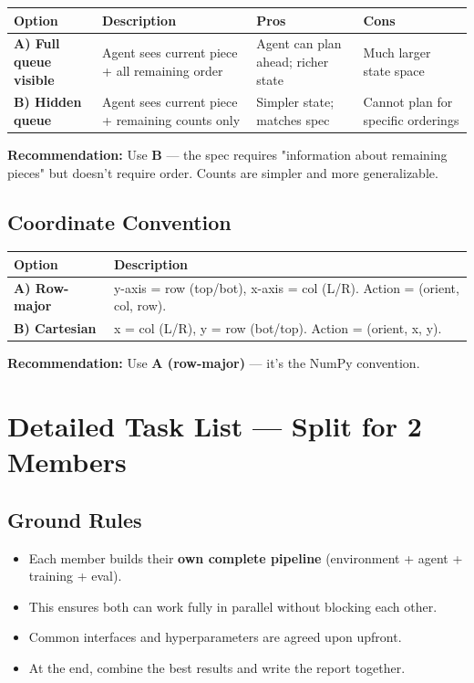 \documentclass[11pt,a4paper]{article}
\begin{document}
\noindent
\begin{tabular}{|l|p{3.5cm}|p{3.5cm}|p{3.5cm}|}
\hline
\textbf{Option} & \textbf{Description} & \textbf{Pros} & \textbf{Cons} \\
\hline
\textbf{A) Full queue visible} & Agent sees current piece + all remaining order & Agent can plan ahead; richer state & Much larger state space \\
\hline
\textbf{B) Hidden queue} & Agent sees current piece + remaining counts only & Simpler state; matches spec & Cannot plan for specific orderings \\
\hline
\end{tabular}

\textbf{Recommendation:} Use \textbf{B} --- the spec requires "information about remaining pieces" but doesn't require order. Counts are simpler and more generalizable.

\subsection{Coordinate Convention}

\noindent
\begin{tabular}{|l|p{11.0cm}|}
\hline
\textbf{Option} & \textbf{Description} \\
\hline
\textbf{A) Row-major} & y-axis = row (top/bot), x-axis = col (L/R). Action = (orient, col, row). \\
\hline
\textbf{B) Cartesian} & x = col (L/R), y = row (bot/top). Action = (orient, x, y). \\
\hline
\end{tabular}

\textbf{Recommendation:} Use \textbf{A (row-major)} --- it's the NumPy convention.

\section{Detailed Task List — Split for 2 Members}

\subsection{Ground Rules}
\begin{itemize}
    \item Each member builds their \textbf{own complete pipeline} (environment + agent + training + eval).
    \item This ensures both can work fully in parallel without blocking each other.
    \item Common interfaces and hyperparameters are agreed upon upfront.
    \item At the end, combine the best results and write the report together.
\end{itemize}
\end{document}
